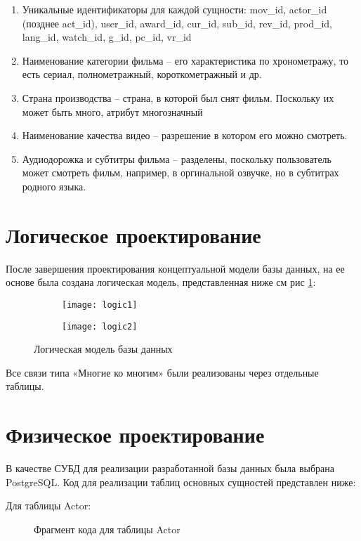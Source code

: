 \begin{enumerate}
\item Уникальные идентификаторы для каждой сущности: mov\_id, actor\_id (позднее act\_id), user\_id, award\_id,
cur\_id, sub\_id, rev\_id, prod\_id, lang\_id, watch\_id, g\_id, pc\_id, vr\_id
\item Наименование категории фильма -- его характеристика по хронометражу, то есть сериал, полнометражный, короткометражный и др.
\item Страна производства -- страна, в которой был снят фильм. Поскольку их может быть много, атрибут многозначный
\item Наименование качества видео -- разрешение в котором его можно смотреть.
\item Аудиодорожка и субтитры фильма -- разделены, поскольку пользователь может смотреть фильм, например, в оргинальной озвучке,
    но в субтитрах родного языка.
\end{enumerate}

\section{Логическое проектирование}
После завершения проектирования концептуальной модели базы данных, на ее основе была создана логическая модель,
представленная ниже {см рис \ref{logic}}:

\begin{figure}
    \begin{subfigure}{.4\linewidth}
    \texttt{[image: logic1]}
    \end{subfigure}

    \begin{subfigure}{.5\linewidth}
    \texttt{[image: logic2]}
    \end{subfigure}

    \caption{Логическая модель базы данных}
    \label{logic}
\end{figure}

Все связи типа «Многие ко многим» были реализованы через отдельные таблицы.
\newpage

\section{Физическое проектирование}
В качестве СУБД для реализации разработанной базы данных была выбрана
PostgreSQL. Код для реализации таблиц основных сущностей представлен ниже:

Для таблицы Actor:
\begin{figure} [h!]
    \caption{Фрагмент кода для таблицы Actor}
\end{figure}

